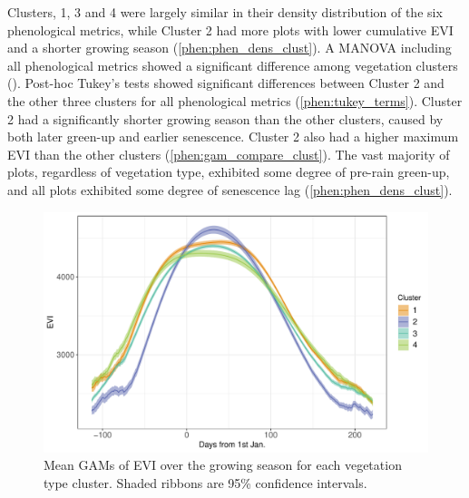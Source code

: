 \begin{refsection}
Clusters, 1, 3 and 4 were largely similar in their density distribution of the six phenological metrics, while Cluster 2 had more plots with lower cumulative EVI and a shorter growing season (\autoref{phen:phen_dens_clust}). A MANOVA including all phenological metrics showed a significant difference among vegetation clusters (\phenManova{}). Post-hoc Tukey's tests showed significant differences between Cluster 2 and the other three clusters for all phenological metrics (\autoref{phen:tukey_terms}). Cluster 2 had a significantly shorter growing season than the other clusters, caused by both later green-up and earlier senescence. Cluster 2 also had a higher maximum EVI than the other clusters (\autoref{phen:gam_compare_clust}). The vast majority of plots, regardless of vegetation type, exhibited some degree of pre-rain green-up, and all plots exhibited some degree of senescence lag (\autoref{phen:phen_dens_clust}).


\begin{figure}
	\includegraphics[width=\linewidth]{img/gam_compare_clust}
	\caption[Mean EVI GAMs per vegetation type]{Mean GAMs of EVI over the growing season for each vegetation type cluster. Shaded ribbons are 95\% confidence intervals.}
	\label{phen:gam_compare_clust}
\end{figure}

 


\end{refsection}
